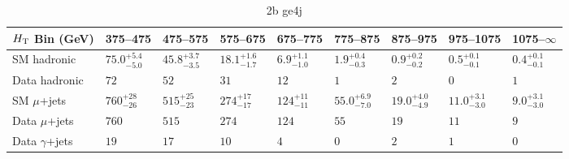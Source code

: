 \documentclass[8pt]{article}
\def\scalht{\mbox{$H_{\rm{T}}$}\xspace}
\newcommand\T{\rule{0pt}{2.6ex}}
\newcommand\B{\rule[-1.2ex]{0pt}{0pt}}
\begin{document}
\begin{table}[ht!]
\caption{2b ge4j}
\label{tab:ensemble-2b ge4j}
\centering
\begin{tabular}{ lllllllll }

\hline
\scalht Bin (GeV)       & 375--475                       & 475--575                       & 575--675                       & 675--775                       & 775--875                       & 875--975                       & 975--1075                      & 1075--$\infty$                 \\ [1.000000ex]
\hline
SM hadronic\T           & $75.0^{+5.4}_{-5.0}$           & $45.8^{+3.7}_{-3.5}$           & $18.1^{+1.6}_{-1.7}$           & $6.9^{+1.1}_{-1.0}$            & $1.9^{+0.4}_{-0.3}$            & $0.9^{+0.2}_{-0.2}$            & $0.5^{+0.1}_{-0.1}$            & $0.4^{+0.1}_{-0.1}$            \\ 
Data hadronic\B         & $72$                           & $52$                           & $31$                           & $12$                           & $1$                            & $2$                            & $0$                            & $1$                            \\ 
\hline
SM $\mu$+jets\T         & $760^{+28}_{-26}$              & $515^{+25}_{-23}$              & $274^{+17}_{-17}$              & $124^{+11}_{-11}$              & $55.0^{+6.9}_{-7.0}$           & $19.0^{+4.0}_{-4.9}$           & $11.0^{+3.1}_{-3.0}$           & $9.0^{+3.1}_{-3.0}$            \\ 
Data $\mu$+jets\B       & $760$                          & $515$                          & $274$                          & $124$                          & $55$                           & $19$                           & $11$                           & $9$                            \\ 
\hline
Data $\gamma$+jets\B    & $19$                           & $17$                           & $10$                           & $4$                            & $0$                            & $2$                            & $1$                            & $0$                            \\ 
\hline

\end{tabular}
\end{table}
\end{document}
